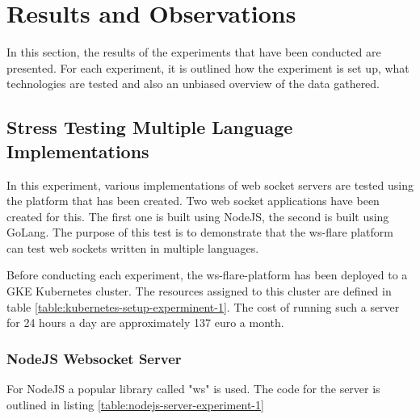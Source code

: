 \chapter{Results and Observations}

In this section, the results of the experiments that have been conducted are presented. For each experiment, it is outlined how the experiment is set up, what technologies are tested and also an unbiased overview of the data gathered.

\section{Stress Testing Multiple Language Implementations}

In this experiment, various implementations of web socket servers are tested using the platform that has been created. Two web socket applications have been created for this. The first one is built using NodeJS, the second is built using GoLang. The purpose of this test is to demonstrate that the ws-flare platform can test web sockets written in multiple languages.

Before conducting each experiment, the ws-flare-platform has been deployed to a GKE Kubernetes cluster. The resources assigned to this cluster are defined in table \ref{table:kubernetes-setup-experminent-1}. The cost of running such a server for 24 hours a day are approximately 137 euro a month.

\begin{table}[H]
\caption{Kubernetes Setup}
\label{table:kubernetes-setup-experminent-1}
\end{table}

\subsection{NodeJS Websocket Server}

For NodeJS a popular library called "ws" is used. The code for the server is outlined in listing \ref{table:nodejs-server-experiment-1}

